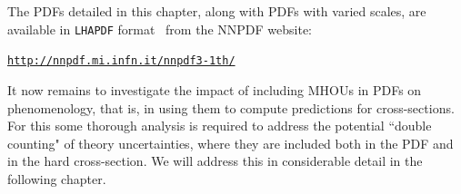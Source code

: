 The PDFs detailed in this chapter, along with PDFs with varied scales, are available in {\tt LHAPDF} format~\cite{Buckley:2014ana} from the NNPDF website:

\begin{center}
 \href{http://nnpdf.mi.infn.it/nnpdf3-1th/}{\tt http://nnpdf.mi.infn.it/nnpdf3-1th/}
\end{center}

It now remains to investigate the impact of including MHOUs in PDFs on phenomenology, that is, in using them to compute predictions for cross-sections. For this some thorough analysis is required to address the potential ``double counting" of theory uncertainties, where they are included both in the PDF and in the hard cross-section. We will address this in considerable detail in the following chapter.